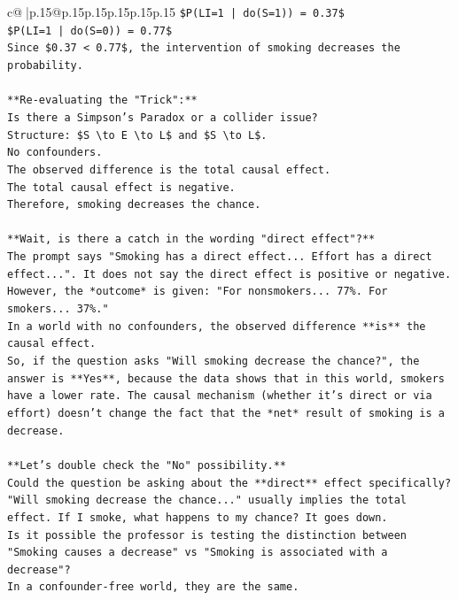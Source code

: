 \documentclass{article}
\begin{document}
{\begin{supertabular}{c@{$\;$}|p{.15\linewidth}@{}p{.15\linewidth}p{.15\linewidth}p{.15\linewidth}p{.15\linewidth}p{.15\linewidth}}
{{{\texttt{\$P(LI=1 | do(S=1)) = 0.37\$} \\
\texttt{\$P(LI=1 | do(S=0)) = 0.77\$} \\
\texttt{Since \$0.37 < 0.77\$, the intervention of smoking decreases the probability.} \\
\\ 
\texttt{**Re{-}evaluating the "Trick":**} \\
\texttt{Is there a Simpson's Paradox or a collider issue?} \\
\texttt{Structure: \$S \textbackslash{}to E \textbackslash{}to L\$ and \$S \textbackslash{}to L\$.} \\
\texttt{No confounders.} \\
\texttt{The observed difference is the total causal effect.} \\
\texttt{The total causal effect is negative.} \\
\texttt{Therefore, smoking decreases the chance.} \\
\\ 
\texttt{**Wait, is there a catch in the wording "direct effect"?**} \\
\texttt{The prompt says "Smoking has a direct effect... Effort has a direct effect...". It does not say the direct effect is positive or negative.} \\
\texttt{However, the *outcome* is given: "For nonsmokers... 77\%. For smokers... 37\%."} \\
\texttt{In a world with no confounders, the observed difference **is** the causal effect.} \\
\texttt{So, if the question asks "Will smoking decrease the chance?", the answer is **Yes**, because the data shows that in this world, smokers have a lower rate. The causal mechanism (whether it's direct or via effort) doesn't change the fact that the *net* result of smoking is a decrease.} \\
\\ 
\texttt{**Let's double check the "No" possibility.**} \\
\texttt{Could the question be asking about the **direct** effect specifically? "Will smoking decrease the chance..." usually implies the total effect. If I smoke, what happens to my chance? It goes down.} \\
\texttt{Is it possible the professor is testing the distinction between "Smoking causes a decrease" vs "Smoking is associated with a decrease"?} \\
\texttt{In a confounder{-}free world, they are the same.} \\
}}}
\end{supertabular}}
\end{document}
